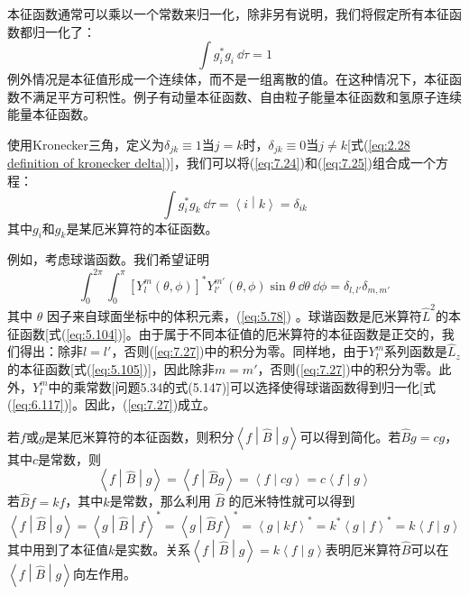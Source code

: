     本征函数通常可以乘以一个常数来归一化，除非另有说明，我们将假定所有本征函数都归一化了：
    \begin{equation}
        \int g_i^{\ast} g_i \:\dd \tau = 1
        \label{eq:7.25}
    \end{equation}
    例外情况是本征值形成一个连续体，而不是一组离散的值。在这种情况下，本征函数不满足平方可积性。例子有动量本征函数、自由粒子能量本征函数和氢原子连续能量本征函数。

    使用Kronecker三角，定义为$\delta_{jk} \equiv 1$当$j=k$时，$\delta_{jk} \equiv 0$当$j \neq k$[式(\ref{eq:2.28 definition of kronecker delta})]，我们可以将(\ref{eq:7.24})和(\ref{eq:7.25})组合成一个方程：
    \begin{equation}
        \int g_i^{\ast}g_k \: \dd \tau = \left\langle i \middle| k \right\rangle = \delta_{ik}
        \label{eq:7.26}
    \end{equation}
    其中$g_i$和$g_k$是某厄米算符的本征函数。

    例如，考虑球谐函数。我们希望证明
    \begin{equation}
        \int_{0}^{2\pi}\int_{0}^{\pi}\left[Y_l^m\left(\theta,\phi\right)\right]^{\ast}Y_{l'}^{m'}\left(\theta,\phi\right)\sin\theta \:\dd \theta \:\dd \phi = \delta_{l,l'}\delta_{m,m'}
        \label{eq:7.27}
    \end{equation}
    其中 $\theta$ 因子来自球面坐标中的体积元素，(\ref{eq:5.78}) 。球谐函数是厄米算符$\hat{L}^2$的本征函数[式(\ref{eq:5.104})]。由于属于不同本征值的厄米算符的本征函数是正交的，我们得出：除非$l = l'$，否则(\ref{eq:7.27})中的积分为零。同样地，由于$Y_l^m$系列函数是$\hat{L}_z$的本征函数[式(\ref{eq:5.105})]，因此除非$m = m'$，否则(\ref{eq:7.27})中的积分为零。此外，$Y_l^m$中的乘常数[问题5.34的式(5.147)]可以选择使得球谐函数得到归一化[式(\ref{eq:6.117})]。因此，(\ref{eq:7.27})成立。

    若$f$或$g$是某厄米算符的本征函数，则积分$\left\langle f \middle| \hat{B} \middle| g \right\rangle$可以得到简化。若$\hat{B}g = c g$，其中$c$是常数，则
    \begin{equation*}
        \left\langle f \middle| \hat{B} \middle| g \right\rangle = \left\langle f \middle| \hat{B}g \right\rangle = \left\langle f \middle| c g \right\rangle = c \left\langle f \middle| g \right\rangle
    \end{equation*}
    若$\hat{B}f = kf$，其中$k$是常数，那么利用 $\hat{B}$ 的厄米特性就可以得到
    \begin{equation*}
        \left\langle f \middle| \hat{B} \middle| g \right\rangle = \left\langle g \middle| \hat{B} \middle| f \right\rangle^{\ast} = \left\langle g \middle| \hat{B}f \right\rangle^{\ast} = \left\langle g \middle| kf \right\rangle^{\ast} = k^{\ast} \left\langle g \middle| f \right\rangle^{\ast} = k\left\langle f \middle| g \right\rangle
    \end{equation*}
    其中用到了本征值$k$是实数。关系$\left\langle f \middle| \hat{B} \middle| g \right\rangle = k \left\langle f \middle| g \right\rangle$表明厄米算符$\hat{B}$可以在$\left\langle f \middle| \hat{B} \middle| g \right\rangle$向左作用。


